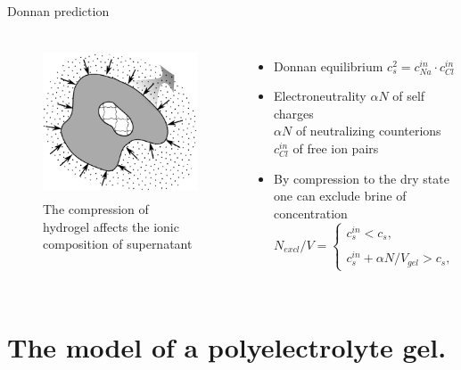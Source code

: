 \documentclass[10pt]{beamer}
\begin{document}
\begin{frame}[fragile]{Donnan prediction}
  \begin{columns}[T,onlytextwidth]%
\begin{figure}
\includegraphics[height=4.5cm]{figures/gel_donnan.png}
\caption{The compression of hydrogel  affects the ionic composition of supernatant}
\end{figure}   
  
  
\begin{itemize}
\item Donnan equilibrium
$c_s^2 = c^{in}_{Na}\cdot c^{in}_{Cl}$
\item Electroneutrality
$\alpha N$ of self charges\\
$\alpha N$ of neutralizing counterions\\
$c^{in}_{Cl}$ of free ion pairs
\item
By compression to the dry state 
one can exclude brine of concentration
\begin{equation*}
N_{excl}/V=\begin{cases}
c_s^{in}<c_s,\\
\\
c_s^{in}+\alpha N/V_{gel}>c_s,
\end{cases}
\end{equation*}
\end{itemize}

  \end{columns}%

  
\end{frame}

\section{The model of a polyelectrolyte gel.}
\end{document}
